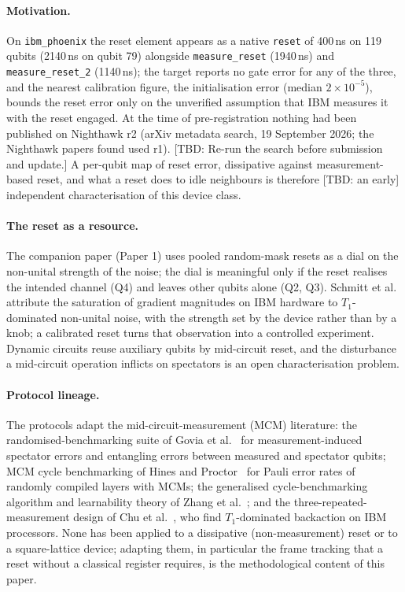 \documentclass[aps,pra,reprint,superscriptaddress,nofootinbib,longbibliography,amsmath,amssymb]{revtex4-2}
\newcommand{\tbd}[1]{\textcolor{orange!80!black}{[TBD: #1]}}
\begin{document}
\paragraph{Motivation.} On \texttt{ibm\_phoenix} the reset element appears as a native \texttt{reset} of 400\,ns on 119 qubits (2140\,ns on qubit 79) alongside \texttt{measure\_reset} (1940\,ns) and \texttt{measure\_reset\_2} (1140\,ns); the target reports no gate error for any of the three, and the nearest calibration figure, the initialisation error (median $2\times10^{-5}$), bounds the reset error only on the unverified assumption that IBM measures it with the reset engaged. At the time of pre-registration nothing had been published on Nighthawk r2 (arXiv metadata search, 19 September 2026; the Nighthawk papers found used r1). \tbd{Re-run the search before submission and update.} A per-qubit map of reset error, dissipative against measurement-based reset, and what a reset does to idle neighbours is therefore \tbd{an early} independent characterisation of this device class.

\paragraph{The reset as a resource.} The companion paper (Paper 1) uses pooled random-mask resets as a dial on the non-unital strength of the noise; the dial is meaningful only if the reset realises the intended channel (Q4) and leaves other qubits alone (Q2, Q3). Schmitt et al.~\cite{Schmitt2026} attribute the saturation of gradient magnitudes on IBM hardware to $T_1$-dominated non-unital noise, with the strength set by the device rather than by a knob; a calibrated reset turns that observation into a controlled experiment. Dynamic circuits reuse auxiliary qubits by mid-circuit reset, and the disturbance a mid-circuit operation inflicts on spectators is an open characterisation problem.

\paragraph{Protocol lineage.} The protocols adapt the mid-circuit-measurement (MCM) literature: the randomised-benchmarking suite of Govia et al.~\cite{Govia2023} for measurement-induced spectator errors and entangling errors between measured and spectator qubits; MCM cycle benchmarking of Hines and Proctor~\cite{Hines2025} for Pauli error rates of randomly compiled layers with MCMs; the generalised cycle-benchmarking algorithm and learnability theory of Zhang et al.~\cite{Zhang2025}; and the three-repeated-measurement design of Chu et al.~\cite{Chu2026}, who find $T_1$-dominated backaction on IBM processors. None has been applied to a dissipative (non-measurement) reset or to a square-lattice device; adapting them, in particular the frame tracking that a reset without a classical register requires, is the methodological content of this paper.
\end{document}
